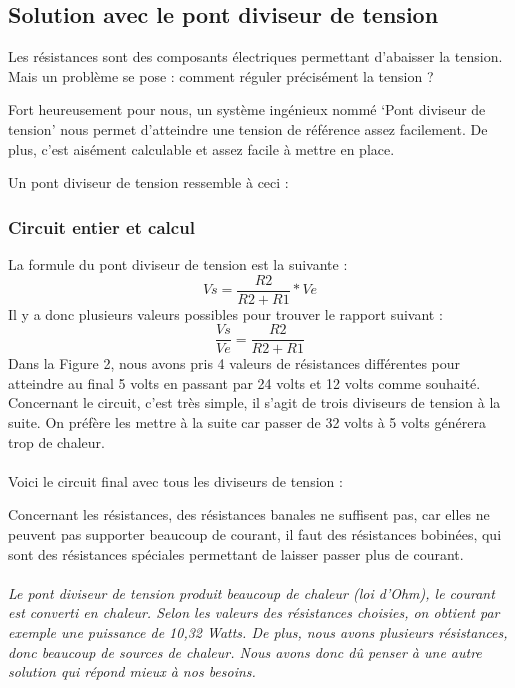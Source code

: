 \documentclass{PackagerQualityN}
\begin{document}
\subsection{Solution avec le pont diviseur de tension}
Les résistances sont des composants électriques permettant d’abaisser la tension.
Mais un problème se pose : comment réguler précisément la tension ?

Fort heureusement pour nous, un système ingénieux nommé ‘Pont diviseur de tension’ nous permet d’atteindre une tension de référence assez facilement. De plus, c'est aisément calculable et assez facile à mettre en place.

Un pont diviseur de tension ressemble à ceci :


\subsubsection{Circuit entier et calcul}

La formule du pont diviseur de tension est la suivante : \[Vs=\frac{R2}{R2+R1}*Ve\]
Il y a donc plusieurs valeurs possibles pour trouver le rapport suivant : \[\frac{Vs}{Ve}=\frac{R2}{R2+R1}\]
Dans la Figure 2, nous avons pris 4 valeurs de résistances différentes pour atteindre au final 5 volts en passant par 24 volts et 12 volts comme souhaité.
Concernant le circuit, c'est très simple, il s'agit de trois diviseurs de tension à la suite. On préfère les mettre à la suite car passer de 32 volts à 5 volts générera trop de chaleur.
\\\\
Voici le circuit final avec tous les diviseurs de tension :



\newp
Concernant les résistances, des résistances banales ne suffisent pas, car elles ne peuvent pas supporter beaucoup de courant, il faut des résistances bobinées, qui sont des résistances spéciales permettant de laisser passer plus de courant.




\paragraph{}
\textit{Le pont diviseur de tension produit beaucoup de chaleur (loi d'Ohm), le courant est converti en chaleur. Selon les valeurs des résistances choisies, on obtient par exemple une puissance de 10,32 Watts.
De plus, nous  avons plusieurs résistances, donc beaucoup de sources de chaleur.
Nous avons donc dû penser à une autre solution qui répond mieux à nos besoins.}
\end{document}
